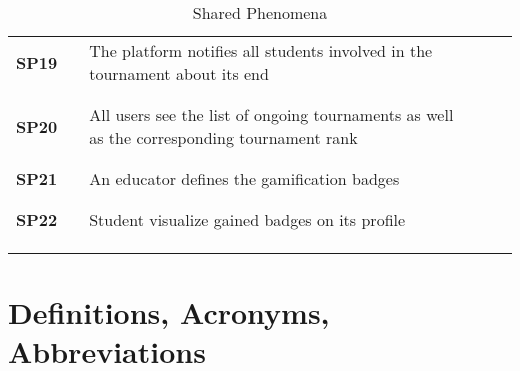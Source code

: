 \begin{longtable}[H]{l l p{8.5cm} l l}
    \textbf{SP19} & \vline & The platform notifies all students involved in the tournament about its end                              & \vline &                        \\
                  &        &                                                                                                          &        &                        \\\hline & & & & \\
    \textbf{SP20} & \vline & All users see the list of  ongoing tournaments as well as the corresponding tournament rank              & \vline &                        \\
                  &        &                                                                                                          &        &                        \\\hline & & & & \\
    \textbf{SP21} & \vline & An educator defines the gamification badges                                                              & \vline &                        \\
                  &        &                                                                                                          &        &                        \\\hline & & & & \\
    \textbf{SP22} & \vline & Student visualize gained badges on its profile                                                           & \vline &                        \\
                  &        &                                                                                                          &        &                        \\
    \hline        &        &                                                                                                          &        &                        \\
    \caption{Shared Phenomena}
\end{longtable}

\section{Definitions, Acronyms, Abbreviations}

